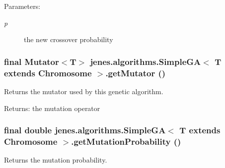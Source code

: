 \begin{Desc}
\item[Parameters:]
\begin{description}
\item[{\em p}]the new crossover probability \end{description}
\end{Desc}
\hypertarget{classjenes_1_1algorithms_1_1_simple_g_a_3_01_t_01extends_01_chromosome_01_4_f1b77602d4f2440c2abde1f8a9d336e7}{
\subsubsection[getMutator]{\setlength{\rightskip}{0pt plus 5cm}final Mutator$<$T$>$ jenes.algorithms.SimpleGA$<$ T extends Chromosome $>$.getMutator ()}}
\label{classjenes_1_1algorithms_1_1_simple_g_a_3_01_t_01extends_01_chromosome_01_4_f1b77602d4f2440c2abde1f8a9d336e7}


Returns the mutator used by this genetic algorithm.

\begin{Desc}
\item[Returns:]the mutation operator \end{Desc}
\hypertarget{classjenes_1_1algorithms_1_1_simple_g_a_3_01_t_01extends_01_chromosome_01_4_0f8be347c9405a5b82d7a10678fc9a3a}{
\subsubsection[getMutationProbability]{\setlength{\rightskip}{0pt plus 5cm}final double jenes.algorithms.SimpleGA$<$ T extends Chromosome $>$.getMutationProbability ()}}
\label{classjenes_1_1algorithms_1_1_simple_g_a_3_01_t_01extends_01_chromosome_01_4_0f8be347c9405a5b82d7a10678fc9a3a}


Returns the mutation probability.

